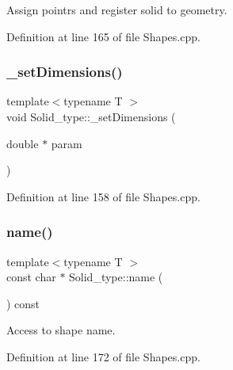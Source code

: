 Assign pointrs and register solid to geometry. 



Definition at line 165 of file Shapes.\+cpp.

\hypertarget{class_d_d4hep_1_1_geometry_1_1_solid__type_a1a3a86774632f79e32518a7c77ad1fe8}{}\label{class_d_d4hep_1_1_geometry_1_1_solid__type_a1a3a86774632f79e32518a7c77ad1fe8} 
\subsubsection{\texorpdfstring{\+\_\+set\+Dimensions()}{\_setDimensions()}}
{\footnotesize\ttfamily template$<$typename T $>$ \\
void Solid\+\_\+type\+::\+\_\+set\+Dimensions (\begin{DoxyParamCaption}\item[{double $\ast$}]{param }\end{DoxyParamCaption})\hspace{0.3cm}{\ttfamily [protected]}}



Definition at line 158 of file Shapes.\+cpp.

\hypertarget{class_d_d4hep_1_1_geometry_1_1_solid__type_a2a8748c719b40f18385b481d4645417f}{}\label{class_d_d4hep_1_1_geometry_1_1_solid__type_a2a8748c719b40f18385b481d4645417f} 
\subsubsection{\texorpdfstring{name()}{name()}}
{\footnotesize\ttfamily template$<$typename T $>$ \\
const char $\ast$ Solid\+\_\+type\+::name (\begin{DoxyParamCaption}{ }\end{DoxyParamCaption}) const}



Access to shape name. 



Definition at line 172 of file Shapes.\+cpp.



